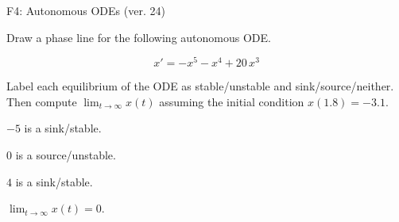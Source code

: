 \begin{exercise}
  \begin{exerciseTitle}F4: Autonomous ODEs (ver. 24)\end{exerciseTitle}
  \begin{exerciseStatement}
    

      Draw a phase line for the following 
      autonomous ODE.
    

    
\[x'= -x^{5} - x^{4} + 20 \, x^{3}\]

    

      Label each equilibrium of the ODE
      as stable/unstable and sink/source/neither.
      Then compute \(\lim_{t\to\infty}x(t)\)
      assuming the initial condition
      \(x( 1.8 )= -3.1\).
    

  \end{exerciseStatement}
  \begin{exerciseAnswer}
    

      \(-5\) is a sink/stable.
      
        \(0\) is a source/unstable.
      
      \(4\) is a sink/stable.
    

    

      \(\lim_{t\to\infty}x(t)=0\).
    

  \end{exerciseAnswer}
\end{exercise}